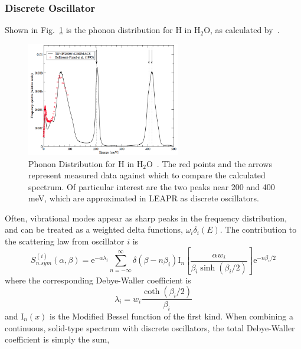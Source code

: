 \documentclass[../master.tex]{subfiles}
\begin{document}
			\subsubsection{Discrete Oscillator}
				Shown in Fig.~\ref{fig:phononDist} is the phonon distribution for H in H$_2$O, as calculated by~\cite{phononModel}.
				\begin{figure}[h]
				    \centering
				    \includegraphics[width=0.6\textwidth]{images/HinH2OphononDist75.png}
				    \caption[Phonon Distribution for H in H$_2$O]{Phonon Distribution for H in H$_2$O~\cite{phononModel}. The red points and the arrows represent measured data against which to compare the calculated spectrum. Of particular interest are the two peaks near 200 and 400 meV, which are approximated in LEAPR as discrete oscillators.}
				    \label{fig:phononDist}
				\end{figure}
                                Often, vibrational modes appear as sharp peaks in the frequency distribution, and can be treated as a weighted delta functions, $\omega_i\delta_i(E)$. The contribution to the scattering law from oscillator $i$ is 
				\begin{equation}
                                  S^{(i)}_{n.sym}(\alpha,\beta)=\mathrm{e}^{-\alpha\lambda_{i}}\sum_{n=-\infty}^{\infty}\delta\left(\beta-n\beta_{i}\right)\mathrm{I}_{n}\left[\frac{\alpha w_{i}}{\beta_{i}\sinh\left(\beta_{i}/2\right)}\right]\mathrm{e}^{-n\beta_{i}/2}\label{eq:longDeltaFunctionSAB}
				\end{equation}
                                where the corresponding Debye-Waller coefficient is 
                                \begin{equation}
                                        \lambda_{i}=w_{i}\frac{\operatorname{coth}\left(\beta_{i}/2\right)}{\beta_{i}}
                                \end{equation}
                                and $\mathrm{I}_n(x)$ is the Modified Bessel function of the first kind. When combining a continuous, solid-type spectrum with discrete oscillators, the total Debye-Waller coefficient is simply the sum,
\end{document}

